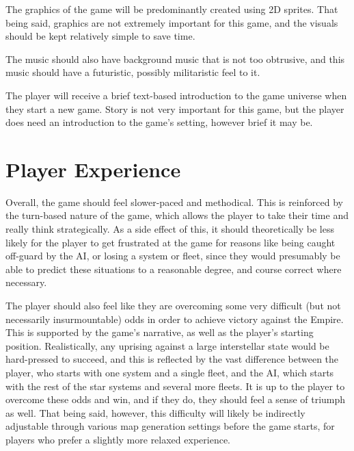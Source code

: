 \documentclass[10pt]{article}
\begin{document}
The graphics of the game will be predominantly created using 2D sprites. That being said,
graphics are not extremely important for this game, and the visuals should be kept relatively simple
to save time.

The music should also have background music that is not too obtrusive, and this music should have
a futuristic, possibly militaristic feel to it.

The player will receive a brief text-based introduction to the game universe when they start a new game.
Story is not very important for this game, but the player does need an introduction to the game's setting,
however brief it may be.

\section{Player Experience}

Overall, the game should feel slower-paced and methodical. This is reinforced by the turn-based nature of the game,
which allows the player to take their time and really think strategically. As a side effect of this, it should
theoretically be less likely for the player to get frustrated at the game for reasons like being caught off-guard
by the AI, or losing a system or fleet, since they would presumably be able to predict these situations to a reasonable degree,
and course correct where necessary.

The player should also feel like they are overcoming some very difficult (but not necessarily insurmountable) odds in order to
achieve victory against the Empire. This is supported by the game's narrative, as well as the player's starting position.
Realistically, any uprising against a large interstellar state would be hard-pressed to succeed, and this is reflected by
the vast difference between the player, who starts with one system and a single fleet, and the AI, which starts with the rest of
the star systems and several more fleets. It is up to the player to overcome these odds and win, and if they do, they should
feel a sense of triumph as well. That being said, however, this difficulty will likely be indirectly adjustable through various
map generation settings before the game starts, for players who prefer a slightly more relaxed experience.

\end{document}
